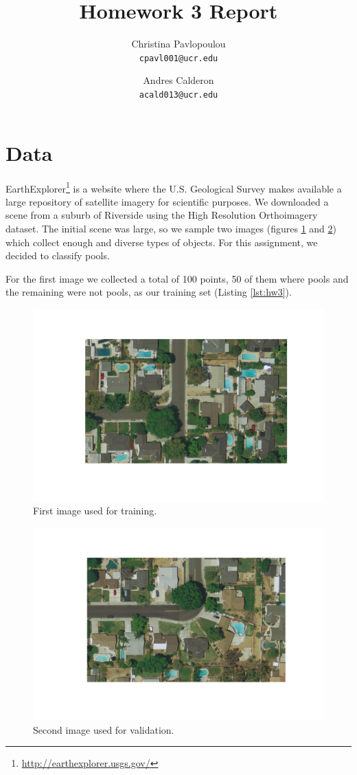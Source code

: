 \documentclass{article}
\title{Homework 3 Report}
\author{
   Christina Pavlopoulou\\
  \small \texttt{cpavl001@ucr.edu}
  \and
   Andres Calderon\\
  \small \texttt{acald013@ucr.edu}
}
\begin{document}
\maketitle

\section{Data}
EarthExplorer\footnote{\url{http://earthexplorer.usgs.gov/}} is a website where the U.S. Geological Survey makes available a large repository of satellite imagery for scientific purposes.  We downloaded a scene from a suburb of Riverside using the High Resolution Orthoimagery dataset.  The initial scene was large, so we sample two images (figures \ref{fig:image1} and \ref{fig:image2}) which collect enough and diverse types of objects.  For this assignment, we decided to classify pools.

For the first image we collected a total of 100 points, 50 of them where pools and the remaining were not pools, as our training set (Listing \ref{lst:hw3}).

\begin{figure}[h]
 \centering
 \includegraphics[trim=10 60 10 50 , clip, width=1\textwidth]{../figures/image1.pdf}
 \caption{First image used for training.}
 \label{fig:image1}
\end{figure}

\begin{figure}
 \centering
 \includegraphics[trim=10 60 10 50 , clip, width=1\textwidth]{../figures/image2.pdf}
 \caption{Second image used for validation.}
 \label{fig:image2}
\end{figure}
\end{document}
